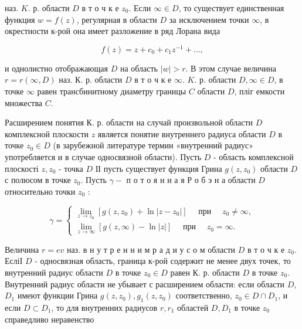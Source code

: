 \documentclass[10pt]{article}
\begin{document}
наз. $K$. р. области $D$ в т о ч к е $z_{0}$. Если $\infty \in D$, то существует единственная функция $w=f(z)$, регулярная в области $D$ за исключением точки $\infty$, в окрестности к-рой она имеет разложение в ряд Лорана вида



\[

f(z)=z+c_{0}+c_{1} z^{-1}+\ldots,

\]



и однолистно отображающая $D$ на область $|w|>r$. В этом случае величина $r=r(\infty, D)$ наз. К. р. области $D$ в т о ч к е $\infty$. $K$. р. области $D, \infty \in D$, в точке $\infty$ равен трансбинитному диаметру границы $C$ области $D$, пліг емкости множества $C$.



Расширением понятия К. р. области на случай произвольной области $D$ комплексной плоскости $z$ является понятие внутреннего радиуса области $D$ в точке $z_{0} \in D$ (в зарубежной литературе термин «внутренний радиус» употребляется и в случае односвязной области). Пусть $D$ - область комплексной плоскості $z, z_{0}$ - точка $D$ ІІ пусть существует функция Грина $g\left(z, z_{0}\right)$ области $D$ с полюсом в точке $z_{0}$. Пусть $\gamma-$ п о т о я н н а я Р о б э н а области $D$ относительно точки $z_{0}$ :



\[

\gamma=\left\{\begin{array}{l}

\lim _{z \rightarrow z_{0}}\left[g\left(z, z_{0}\right)+\ln \left|z-z_{0}\right|\right] \quad \text { при } \quad z_{0} \neq \infty, \\

\lim _{z \rightarrow \infty}[g(z, \infty)-\ln |z|] \quad \text { при } \quad z_{0}=\infty .

\end{array}\right.

\]



Величина $r=e v$ наз. в н у т р е н н и м р а д и у с о м области $D$ в т о ч к е $z_{0}$. ЕсліІ $D$ - односвязная область, граница к-рой содержит не менее двух точек, то внутренний радиус области $D$ в точке $z_{0} \in D$ равен К. р. области $D$ в точке $z_{0}$. Внутренний радиус области не убывает с расширением области: если области $D$, $D_{1}$ имеют функции Грина $g\left(z, z_{0}\right), g_{1}\left(z, z_{0}\right)$ соответственно, $z_{0} \in D \cap D_{1}$, и если $D \subset D_{1}$, то для внутренних радиусов $r, r_{1}$ областей $D, D_{1}$ в точке $z_{0}$ справедливо неравенство
\end{document}
